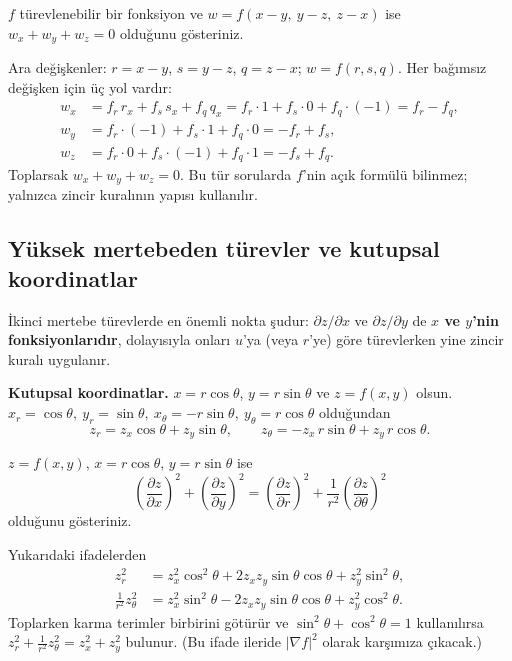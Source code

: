 \begin{soru}
$f$ türevlenebilir bir fonksiyon ve $w=f(x-y,\ y-z,\ z-x)$ ise $w_x+w_y+w_z=0$ olduğunu gösteriniz.
\end{soru}
\begin{cevap}
Ara değişkenler: $r=x-y$, $s=y-z$, $q=z-x$; $w=f(r,s,q)$. Her bağımsız değişken için üç yol vardır:
\begin{align*}
w_x&=f_r\,r_x+f_s\,s_x+f_q\,q_x=f_r\cdot1+f_s\cdot0+f_q\cdot(-1)=f_r-f_q,\\
w_y&=f_r\cdot(-1)+f_s\cdot1+f_q\cdot0=-f_r+f_s,\\
w_z&=f_r\cdot0+f_s\cdot(-1)+f_q\cdot1=-f_s+f_q.
\end{align*}
Toplarsak $w_x+w_y+w_z=0$. Bu tür sorularda $f$'nin açık formülü bilinmez; yalnızca zincir kuralının yapısı kullanılır.
\end{cevap}

\subsection{Yüksek mertebeden türevler ve kutupsal koordinatlar}

İkinci mertebe türevlerde en önemli nokta şudur: $\partial z/\partial x$ ve $\partial z/\partial y$ de \textbf{$x$ ve
$y$'nin fonksiyonlarıdır}, dolayısıyla onları $u$'ya (veya $r$'ye) göre türevlerken yine zincir kuralı uygulanır.

\textbf{Kutupsal koordinatlar.} $x=r\cos\theta$, $y=r\sin\theta$ ve $z=f(x,y)$ olsun.
$x_r=\cos\theta,\ y_r=\sin\theta,\ x_\theta=-r\sin\theta,\ y_\theta=r\cos\theta$ olduğundan
\[
z_r=z_x\cos\theta+z_y\sin\theta,\qquad z_\theta=-z_x\,r\sin\theta+z_y\,r\cos\theta .
\]

\begin{soru}
$z=f(x,y)$, $x=r\cos\theta$, $y=r\sin\theta$ ise
\[
\left(\frac{\partial z}{\partial x}\right)^2+\left(\frac{\partial z}{\partial y}\right)^2
=\left(\frac{\partial z}{\partial r}\right)^2+\frac{1}{r^2}\left(\frac{\partial z}{\partial \theta}\right)^2
\]
olduğunu gösteriniz.
\end{soru}
\begin{cevap}
Yukarıdaki ifadelerden
\begin{align*}
z_r^2&=z_x^2\cos^2\theta+2z_xz_y\sin\theta\cos\theta+z_y^2\sin^2\theta,\\
\frac{1}{r^2}z_\theta^2&=z_x^2\sin^2\theta-2z_xz_y\sin\theta\cos\theta+z_y^2\cos^2\theta .
\end{align*}
Toplarken karma terimler birbirini götürür ve $\sin^2\theta+\cos^2\theta=1$ kullanılırsa
$z_r^2+\frac{1}{r^2}z_\theta^2=z_x^2+z_y^2$ bulunur. (Bu ifade ileride $|\nabla f|^2$ olarak karşımıza çıkacak.)
\end{cevap}

